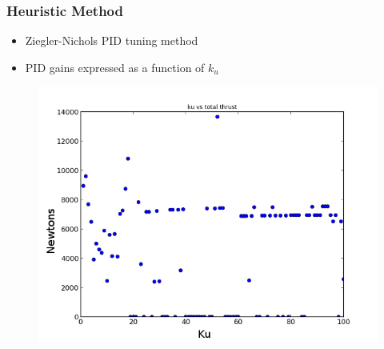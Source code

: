 \documentclass{beamer}
\begin{document}
\begin{frame}

\frametitle{Heuristic Method}

\begin{itemize}
\item Ziegler-Nichols PID tuning method
\item PID gains expressed as a function of $k_u$
\end{itemize}

\vspace{-7mm}

\begin{figure}[htbp]
	\centering
		\includegraphics[scale=0.60]{Figures/kuvsthrust.png}
	\label{fig:ku vs thrust}
\end{figure}

\end{frame}
\end{document}
